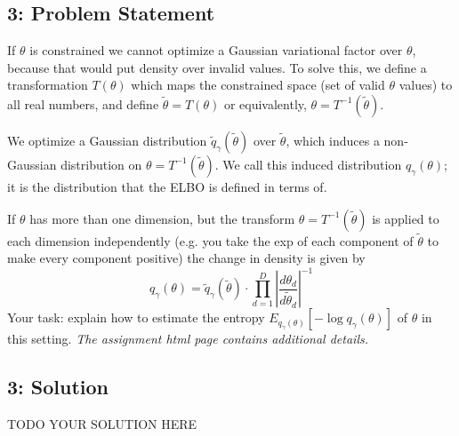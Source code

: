 \documentclass[10pt]{article}
\newcommand{\officialdirections}[1]{{\color{purple} #1}}
\begin{document}
\newpage
\officialdirections{
\subsection*{3: Problem Statement}
If $\theta$ is constrained we cannot optimize a Gaussian variational factor over $\theta$, because that would put density over invalid values. To solve this, we define a transformation $T(\theta)$ which maps the constrained space (set of valid $\theta$ values) to all real numbers, and define $\tilde{\theta} = T(\theta)$ or equivalently, $\theta = T^{-1}(\tilde{\theta})$.

We optimize a Gaussian distribution $\tilde{q}_\gamma(\tilde{\theta})$ over $\tilde{\theta}$, which induces a non-Gaussian distribution on $\theta = T^{-1}(\tilde{\theta})$. We call this induced distribution $q_\gamma(\theta)$; it is the distribution that the ELBO is defined in terms of.

If $\theta$ has more than one dimension, but the transform $\theta = T^{-1}(\tilde{\theta})$ is applied to each dimension independently (e.g. you take the exp of each component of $\tilde{\theta}$ to make every component positive) the change in density is given by
\begin{equation*}
q_\gamma\left(\theta\right) =\tilde{q}_\gamma(\tilde{\theta}) \cdot \prod_{d=1}^D  \left|\frac{d \theta_d}{d \tilde{\theta}_d}\right|^{-1}
\end{equation*}
Your task: explain how to estimate the entropy $E_{q_\gamma(\theta)}[-\log q_\gamma(\theta)]$ of $\theta$ in this setting. \emph{The assignment html page contains additional details.}
}

\subsection{3: Solution}

TODO YOUR SOLUTION HERE
\end{document}
